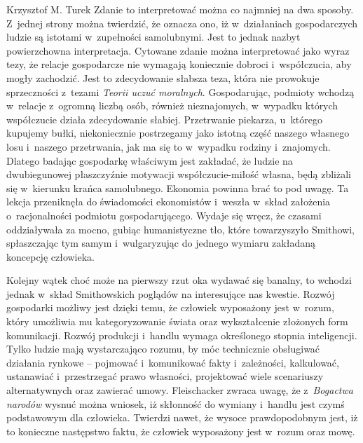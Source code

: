 \begin{artplenv}{Krzysztof M. Turek}
Zdanie to interpretować można co najmniej na dwa sposoby. Z~jednej strony można twierdzić, że oznacza ono,
iż w~działaniach gospodarczych ludzie są istotami w~zupełności samolubnymi. Jest to jednak nazbyt powierzchowna
interpretacja. Cytowane zdanie można interpretować jako wyraz tezy, że relacje gospodarcze nie wymagają koniecznie
dobroci i~współczucia, aby mogły zachodzić. Jest to zdecydowanie słabsza teza, która nie prowokuje
sprzeczności z~tezami \textit{Teorii uczuć moralnych}. Gospodarując, podmioty wchodzą w~relacje z~ogromną liczbą osób, również
nieznajomych, w~wypadku których współczucie działa zdecydowanie słabiej. Przetrwanie piekarza, u~którego kupujemy
bułki, niekoniecznie postrzegamy jako istotną część naszego własnego losu i~naszego przetrwania, jak ma się
to w~wypadku rodziny i~znajomych. Dlatego badając gospodarkę właściwym jest zakładać, że ludzie na dwubiegunowej
płaszczyźnie motywacji współczucie-miłość własna, będą zbliżali się w~kierunku krańca samolubnego. Ekonomia powinna
brać to pod uwagę. Ta lekcja przeniknęła do świadomości ekonomistów i~weszła w~skład założenia o~racjonalności podmiotu
gospodarującego. Wydaje się wręcz, że czasami oddziaływała za mocno, gubiąc humanistyczne tło, które towarzyszyło
Smithowi, spłaszczając tym samym i~wulgaryzując do jednego wymiaru zakładaną koncepcję człowieka.

Kolejny wątek choć może na pierwszy rzut oka wydawać się banalny, to wchodzi jednak w~skład Smithowskich poglądów na
interesujące nas kwestie. Rozwój gospodarki możliwy jest dzięki temu, że człowiek wyposażony jest w~rozum, który
umożliwia mu kategoryzowanie świata oraz wykształcenie złożonych form komunikacji. Rozwój produkcji i~handlu wymaga
określonego stopnia inteligencji. Tylko ludzie mają wystarczająco rozumu, by móc technicznie obsługiwać działania
rynkowe -- pojmować i~komunikować fakty i~zależności, kalkulować, ustanawiać i~przestrzegać prawo własności, projektować
wiele scenariuszy alternatywnych oraz zawierać umowy. Fleischacker
\parencite*[s.~19]{fleischacker_adam_2005}
zwraca uwagę, że z~\textit{Bogactwa narodów} wysnuć można
wniosek, iż skłonność do wymiany i~handlu jest czymś podstawowym dla człowieka. Twierdzi nawet, że wysoce
prawdopodobnym jest, iż to konieczne następstwo faktu, że człowiek wyposażony jest w~rozum oraz mowę.


\end{artplenv}
